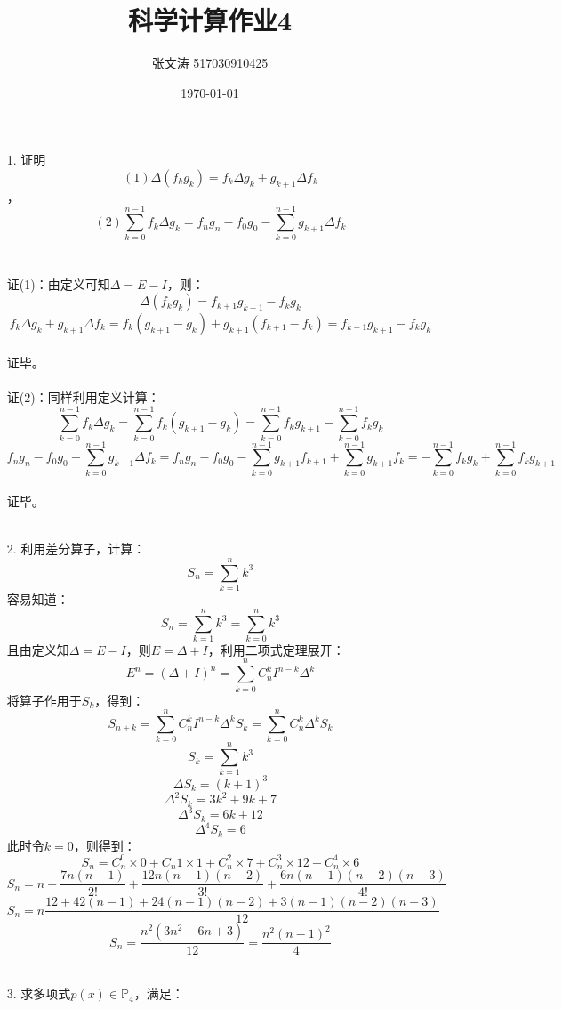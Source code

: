 \documentclass{article}
\title{科学计算作业4}
\author{张文涛 517030910425}
\date{\today}
\begin{document}
	\maketitle
	\begin{itemize}
		\item[1.]证明
		$$(1)\Delta(f_{k}g_{k}) = f_{k}\Delta g_{k} + g_{k+1}\Delta f_{k}$$，
		$$(2)\sum\limits_{k = 0}^{n-1}f_{k}\Delta g_{k} = f_{n}g_{n} - f_{0}g_{0} - \sum\limits_{k = 0}^{n-1}g_{k+1}\Delta f_{k}$$\\\\
		证(1)：由定义可知$\Delta = E - I$，则：
		$$\Delta(f_{k}g_{k}) = f_{k+1}g_{k+1} - f_{k}g_{k}$$
		$$ f_{k}\Delta g_{k} + g_{k+1}\Delta f_{k} = f_{k}(g_{k+1} - g_{k}) +g_{k+1}(f_{k+1} - f_{k}) = f_{k+1}g_{k+1} - f_{k}g_{k}$$\\
		证毕。\\\\
		证(2)：同样利用定义计算：
		$$\sum\limits_{k = 0}^{n-1}f_{k}\Delta g_{k} = \sum\limits_{k = 0}^{n-1}f_{k}(g_{k+1} - g_{k}) = \sum\limits_{k = 0}^{n-1}f_{k}g_{k+1} - \sum\limits_{k = 0}^{n-1}f_{k}g_{k}$$
		$$ f_{n}g_{n} - f_{0}g_{0} - \sum\limits_{k = 0}^{n-1}g_{k+1}\Delta f_{k} = f_{n}g_{n} - f_{0}g_{0} - \sum\limits_{k = 0}^{n-1}g_{k+1}f_{k+1} + \sum\limits_{k = 0}^{n-1}g_{k+1}f_{k} = - \sum\limits_{k = 0}^{n-1}f_{k}g_{k} + \sum\limits_{k = 0}^{n-1}f_{k}g_{k+1} $$\\
		证毕。\\\\
		\item[2.]利用差分算子，计算：
		$$S_{n}=\sum_{k=1}^{n}k^{3}$$
		容易知道：
		$$S_{n} = \sum_{k=1}^{n}k^{3} = \sum_{k=0}^{n}k^{3}$$
		且由定义知$\Delta = E - I$，则$E = \Delta + I$，利用二项式定理展开：
		$$E^n = (\Delta + I)^{n} = \sum_{k = 0}^{n}C_{n}^{k}I^{n-k}\Delta^{k}$$
		将算子作用于$S_{k}$，得到：
		$$S_{n+k} = \sum_{k = 0}^{n}C_{n}^{k}I^{n-k}\Delta^{k}S_{k} = \sum_{k = 0}^{n}C_{n}^{k}\Delta^{k}S_{k}$$
		$$S_{k} = \sum_{k=1}^{n}k^{3}$$
		$$\Delta S_{k} = (k+1)^{3}$$
		$$\Delta^{2} S_{k} = 3k^{2} + 9k + 7$$
		$$\Delta^{3} S_{k} = 6k + 12$$
		$$\Delta^{4} S_{k} = 6$$
		此时令$k = 0$，则得到：
		$$S_{n} = C_{n}^{0}\times0 + C_{n}{1}\times1 +C_{n}^{2}\times7 + C_{n}^{3}\times12 + C_{n}^{4}\times6$$
		$$S_{n} = n + \frac{7n(n-1)}{2!} + \frac{12n(n-1)(n-2)}{3!} + \frac{6n(n-1)(n-2)(n-3)}{4!}$$
		$$S_{n} = n\frac{12 + 42(n-1) + 24(n-1)(n-2) + 3(n-1)(n-2)(n-3)}{12}$$
		$$S_{n} = \frac{n^{2}(3n^2 - 6n + 3)}{12} = \frac{n^{2}(n-1)^2}{4}$$\\
		\item[3.]求多项式$p(x)\in\mathbb{P}_{4}$，满足：

\end{itemize}
\end{document}
